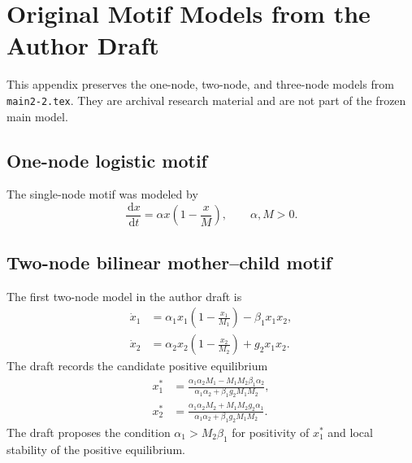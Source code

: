 \documentclass[11pt, reqno]{amsart}
\theoremstyle{definition}
\theoremstyle{remark}
\newcommand{\dd}{\,\mathrm{d}}
\begin{document}
	
	\appendix
	
	\section{Original Motif Models from the Author Draft}
	\label{app:motifs}
	
	This appendix preserves the one-node, two-node, and three-node models from
	\texttt{main2-2.tex}.  They are archival research material and are not part of
	the frozen main model.
	
	\subsection{One-node logistic motif}
	
	The single-node motif was modeled by
	\begin{equation}
		\label{eq:one-node-logistic}
		\frac{\dd x}{\dd t}
		=
		\alpha x\left(1-\frac{x}{M}\right),
		\qquad
		\alpha,M>0.
	\end{equation}
	
	
	\subsection{Two-node bilinear mother--child motif}
	
	The first two-node model in the author draft is
	\begin{equation}
		\label{eq:two-node-bilinear}
		\begin{aligned}
			\dot x_1
			&=
			\alpha_1x_1\left(1-\frac{x_1}{M_1}\right)
			-\beta_1x_1x_2,\\
			\dot x_2
			&=
			\alpha_2x_2\left(1-\frac{x_2}{M_2}\right)
			+g_2x_1x_2.
		\end{aligned}
	\end{equation}
	The draft records the candidate positive equilibrium
	\begin{equation}
		\label{eq:two-node-equilibrium}
		\begin{aligned}
			x_1^*
			&=
			\frac{
				\alpha_1\alpha_2M_1
				-M_1M_2\beta_1\alpha_2
			}{
				\alpha_1\alpha_2
				+\beta_1g_2M_1M_2
			},\\
			x_2^*
			&=
			\frac{
				\alpha_1\alpha_2M_2
				+M_1M_2g_2\alpha_1
			}{
				\alpha_1\alpha_2
				+\beta_1g_2M_1M_2
			}.
		\end{aligned}
	\end{equation}
	The draft proposes the condition $\alpha_1>M_2\beta_1$ for positivity of
	$x_1^*$ and local stability of the positive equilibrium.
	
\end{document}
